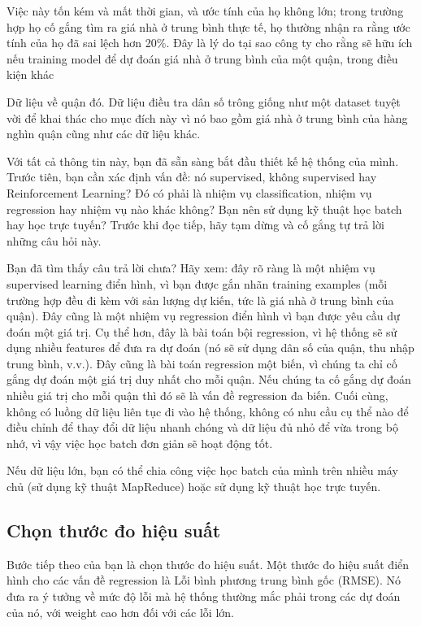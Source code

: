 Việc này tốn kém và mất thời gian, và ước tính của họ không lớn; trong trường hợp họ cố gắng tìm ra giá nhà ở trung bình thực tế, họ thường nhận ra rằng ước tính của họ đã sai lệch hơn 20\%. Đây là lý do tại sao công ty cho rằng sẽ hữu ích nếu training model để dự đoán giá nhà ở trung bình của một quận, trong điều kiện khác

Dữ liệu về quận đó. Dữ liệu điều tra dân số trông giống như một dataset tuyệt vời để khai thác cho mục đích này vì nó bao gồm giá nhà ở trung bình của hàng nghìn quận cũng như các dữ liệu khác.

Với tất cả thông tin này, bạn đã sẵn sàng bắt đầu thiết kế hệ thống của mình. Trước tiên, bạn cần xác định vấn đề: nó supervised, không supervised hay Reinforcement Learning? Đó có phải là nhiệm vụ classification, nhiệm vụ regression hay nhiệm vụ nào khác không? Bạn nên sử dụng kỹ thuật học batch hay học trực tuyến? Trước khi đọc tiếp, hãy tạm dừng và cố gắng tự trả lời những câu hỏi này.

Bạn đã tìm thấy câu trả lời chưa? Hãy xem: đây rõ ràng là một nhiệm vụ supervised learning điển hình, vì bạn được gắn nhãn training examples (mỗi trường hợp đều đi kèm với sản lượng dự kiến, tức là giá nhà ở trung bình của quận). Đây cũng là một nhiệm vụ regression điển hình vì bạn được yêu cầu dự đoán một giá trị. Cụ thể hơn, đây là bài toán bội regression, vì hệ thống sẽ sử dụng nhiều features để đưa ra dự đoán (nó sẽ sử dụng dân số của quận, thu nhập trung bình, v.v.). Đây cũng là bài toán regression một biến, vì chúng ta chỉ cố gắng dự đoán một giá trị duy nhất cho mỗi quận. Nếu chúng ta cố gắng dự đoán nhiều giá trị cho mỗi quận thì đó sẽ là vấn đề regression đa biến. Cuối cùng, không có luồng dữ liệu liên tục đi vào hệ thống, không có nhu cầu cụ thể nào để điều chỉnh để thay đổi dữ liệu nhanh chóng và dữ liệu đủ nhỏ để vừa trong bộ nhớ, vì vậy việc học batch đơn giản sẽ hoạt động tốt.

Nếu dữ liệu lớn, bạn có thể chia công việc học batch của mình trên nhiều máy chủ (sử dụng kỹ thuật MapReduce) hoặc sử dụng kỹ thuật học trực tuyến.

\subsection{Chọn thước đo hiệu suất}

Bước tiếp theo của bạn là chọn thước đo hiệu suất. Một thước đo hiệu suất điển hình cho các vấn đề regression là Lỗi bình phương trung bình gốc (RMSE). Nó đưa ra ý tưởng về mức độ lỗi mà hệ thống thường mắc phải trong các dự đoán của nó, với weight cao hơn đối với các lỗi lớn.

